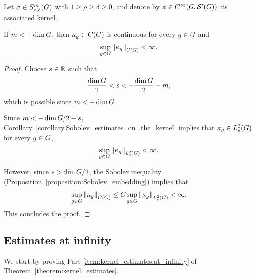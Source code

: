 \begin{corollary}
\label{corollary:kernel_estimates:at_origin:negative}
    Let $\sigma \in \SymbolClass m {\rho,\delta}$ with $1 \geq \rho \geq \delta \geq 0$,
    and denote by $\kappa \in \SmoothFunctions {\Group, \TemperedDistributions \Group}$ its associated kernel.

    If $m < -\dim \Group$,
    then $\kappa_g \in \ContinuousFunctions \Group$ is continuous for every $g \in \Group$ and
    \begin{align*}
        \sup_{g \in \Group} \norm [\ContinuousFunctions \Group] {\kappa_g} < \infty.
    \end{align*}
\end{corollary}
\begin{proof}
    Choose $s \in \R$ such that
    \begin{align*}
        \frac {\dim \Group} 2 < s < -\frac {\dim \Group} 2 - m,
    \end{align*}
    which is possible since $m < -\dim \Group$.

    Since $m < -\dim \Group/2 - s$,
    Corollary~\ref{corollary:Sobolev_estimates_on_the_kernel} implies that
    $\kappa_g \in \Sobolev s$ for every $g \in \Group$,
    \begin{align*}
        \sup_{g \in \Group} \norm [\Sobolev s] {\kappa_g} < \infty.
    \end{align*}

    However,
    since $s > \dim \Group / 2$,
    the Sobolev inequality (Proposition~\ref{proposition:Sobolev_embedding})
    implies that
    \begin{align*}
        \sup_{g \in \Group} \norm [\ContinuousFunctions \Group] {\kappa_g}
        \leq C \sup_{g \in \Group} \norm [\Sobolev s] {\kappa_g} < \infty.
    \end{align*}
    This concludes the proof.
\end{proof}

\subsection{Estimates at infinity}

We start by proving Part \ref{item:kernel_estimates:at_infinity} of Theorem~\ref{theorem:kernel_estimates}.


